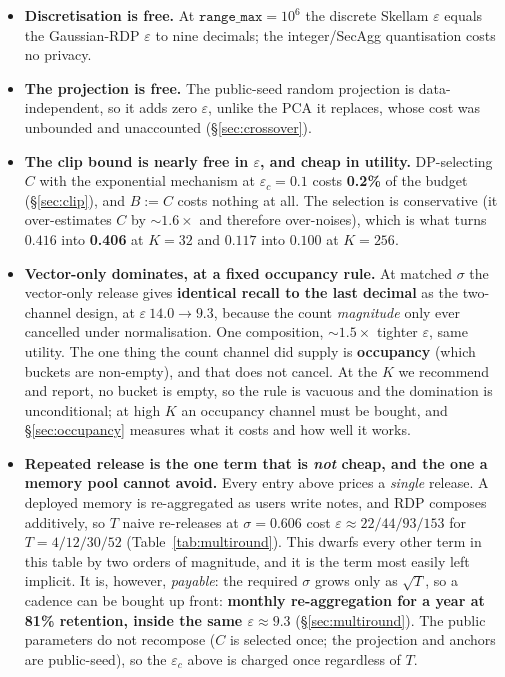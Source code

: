 \documentclass[pdflatex,sn-mathphys-num,12pt]{sn-jnl}
\theoremstyle{thmstyleone}%
\theoremstyle{thmstyletwo}%
\theoremstyle{thmstylethree}%
\newcommand{\eps}{\varepsilon}
\newcommand{\secref}[1]{\S\ref{#1}}
\begin{document}
\begin{itemize}
  \item \textbf{Discretisation is free.} At $\texttt{range\_max} = 10^{6}$ the discrete
    Skellam $\eps$ equals the Gaussian-RDP $\eps$ to nine decimals; the integer/SecAgg
    quantisation costs no privacy.
  \item \textbf{The projection is free.} The public-seed random projection is
    data-independent, so it adds zero $\eps$, unlike the PCA it replaces, whose cost was
    unbounded and unaccounted (\secref{sec:crossover}).
  \item \textbf{The clip bound is nearly free in $\eps$, and cheap in utility.}
    DP-selecting $C$ with the exponential mechanism at $\eps_c = 0.1$ costs \textbf{0.2\%}
    of the budget (\secref{sec:clip}), and $B := C$ costs nothing at all. The selection is
    conservative (it over-estimates $C$ by ${\sim}1.6\times$ and therefore over-noises),
    which is what turns $0.416$ into \textbf{0.406} at $K = 32$ and $0.117$ into $0.100$ at
    $K = 256$.
  \item \textbf{Vector-only dominates, at a fixed occupancy rule.} At matched $\sigma$ the
    vector-only release gives \textbf{identical recall to the last decimal} as the
    two-channel design, at $\eps\ 14.0 \to 9.3$, because the count \emph{magnitude} only ever
    cancelled under normalisation. One composition, ${\sim}1.5\times$ tighter $\eps$, same
    utility. The one thing the count channel did supply is \textbf{occupancy} (which
    buckets are non-empty), and that does not cancel. At the $K$ we recommend and report, no
    bucket is empty, so the rule is vacuous and the domination is unconditional; at high $K$
    an occupancy channel must be bought, and \secref{sec:occupancy} measures what it costs
    and how well it works.

  \item \textbf{Repeated release is the one term that is \emph{not} cheap, and the one a
    memory pool cannot avoid.} Every entry above prices a \emph{single} release. A deployed
    memory is re-aggregated as users write notes, and RDP composes additively, so $T$ naive
    re-releases at $\sigma = 0.606$ cost $\eps \approx 22 / 44 / 93 / 153$ for
    $T = 4 / 12 / 30 / 52$ (Table~\ref{tab:multiround}). This dwarfs every other term in this
    table by two orders of magnitude, and it is the term most easily left implicit. It is,
    however, \emph{payable}: the required $\sigma$ grows only as $\sqrt{T}$, so a cadence can
    be bought up front: \textbf{monthly re-aggregation for a year at 81\% retention, inside
    the same $\eps \approx 9.3$} (\secref{sec:multiround}). The public parameters do not
    recompose ($C$ is selected once; the projection and anchors are public-seed), so the
    $\eps_c$ above is charged once regardless of $T$.
\end{itemize}
\end{document}
